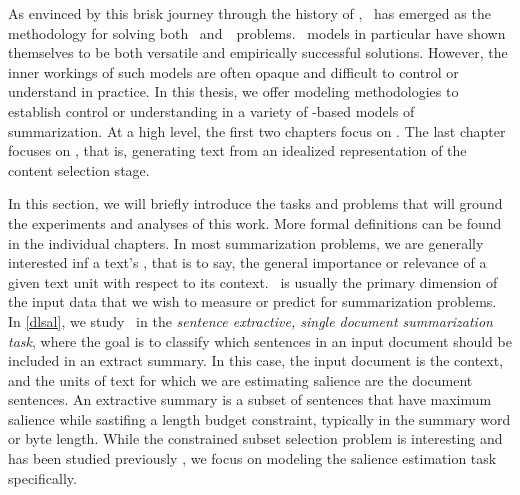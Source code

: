 As envinced by this brisk journey through the history of \languagegeneration,
\machinelearning~has emerged as the  methodology for 
solving both \texttotext~and~\datatotext~problems. \Deeplearning~models in 
particular have shown themselves to be both versatile and empirically 
successful solutions. However, the inner workings of such models are often 
opaque and difficult to 
control or understand in practice. In this thesis, we offer modeling 
methodologies to establish control or understanding in a variety of  
\machinelearning-based models of summarization. At a high level, the 
first two chapters focus on \contentselection.
The last chapter focuses on \surfacerealization, that is, generating text
from an idealized representation of the content selection stage. 

In this section, we will briefly introduce the tasks and problems that will 
ground the experiments and analyses of this work. More formal definitions
can be found in the individual chapters. 
%
%
%
In most summarization problems, we are generally interested inf 
a text's \textit{\salience}, that is to say, the general importance or relevance of 
a given text unit with respect to its context. \Salience~is usually the primary dimension of the input data that we wish to 
measure or predict for summarization problems. 
In \autoref{dlsal}, we study \salienceestimation~in 
the \emph{sentence extractive, single document summarization task}, 
where the goal is to classify which sentences in an input document should be 
included in an extract summary. 
In this case, the input document is the context, and the units of text for 
which we are estimating salience are the document
sentences. An extractive summary is a subset of sentences that have maximum
salience while sastifing a length budget constraint, typically in the summary
word or byte length. While the constrained subset selection problem is 
interesting and has been studied previously \cite{maybemmr,mcdonald,others},
we focus on modeling the salience estimation task specifically. 

